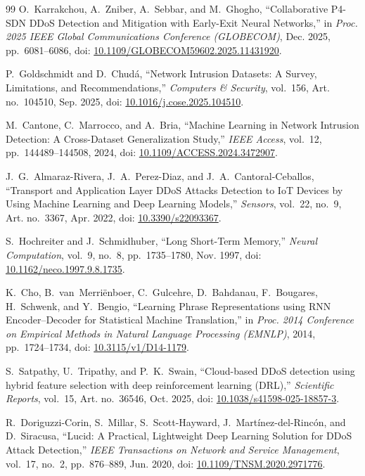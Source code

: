 \documentclass[a4paper,12pt]{article}
\begin{document}
\begin{thebibliography}{99}
O.~Karrakchou, A.~Zniber, A.~Sebbar, and M.~Ghogho, ``Collaborative P4-SDN DDoS Detection and Mitigation with Early-Exit Neural Networks,'' in \textit{Proc. 2025 IEEE Global Communications Conference (GLOBECOM)}, Dec. 2025, pp.~6081--6086, doi: \href{https://doi.org/10.1109/GLOBECOM59602.2025.11431920}{10.1109/GLOBECOM59602.2025.11431920}.

P.~Goldschmidt and D.~Chudá, ``Network Intrusion Datasets: A Survey, Limitations, and Recommendations,'' \textit{Computers \& Security}, vol.~156, Art. no.~104510, Sep. 2025, doi: \href{https://doi.org/10.1016/j.cose.2025.104510}{10.1016/j.cose.2025.104510}.

M.~Cantone, C.~Marrocco, and A.~Bria, ``Machine Learning in Network Intrusion Detection: A Cross-Dataset Generalization Study,'' \textit{IEEE Access}, vol.~12, pp.~144489--144508, 2024, doi: \href{https://doi.org/10.1109/ACCESS.2024.3472907}{10.1109/ACCESS.2024.3472907}.

J.~G.~Almaraz-Rivera, J.~A.~Perez-Diaz, and J.~A.~Cantoral-Ceballos, ``Transport and Application Layer DDoS Attacks Detection to IoT Devices by Using Machine Learning and Deep Learning Models,'' \textit{Sensors}, vol.~22, no.~9, Art. no.~3367, Apr. 2022, doi: \href{https://doi.org/10.3390/s22093367}{10.3390/s22093367}.

S.~Hochreiter and J.~Schmidhuber, ``Long Short-Term Memory,'' \textit{Neural Computation}, vol.~9, no.~8, pp.~1735--1780, Nov. 1997, doi: \href{https://doi.org/10.1162/neco.1997.9.8.1735}{10.1162/neco.1997.9.8.1735}.

K.~Cho, B.~van~Merriënboer, C.~Gulcehre, D.~Bahdanau, F.~Bougares, H.~Schwenk, and Y.~Bengio, ``Learning Phrase Representations using RNN Encoder--Decoder for Statistical Machine Translation,'' in \textit{Proc. 2014 Conference on Empirical Methods in Natural Language Processing (EMNLP)}, 2014, pp.~1724--1734, doi: \href{https://doi.org/10.3115/v1/D14-1179}{10.3115/v1/D14-1179}.

S.~Satpathy, U.~Tripathy, and P.~K.~Swain, ``Cloud-based DDoS detection using hybrid feature selection with deep reinforcement learning (DRL),'' \textit{Scientific Reports}, vol.~15, Art. no.~36546, Oct. 2025, doi: \href{https://doi.org/10.1038/s41598-025-18857-3}{10.1038/s41598-025-18857-3}.

R.~Doriguzzi-Corin, S.~Millar, S.~Scott-Hayward, J.~Martínez-del-Rincón, and D.~Siracusa, ``Lucid: A Practical, Lightweight Deep Learning Solution for DDoS Attack Detection,'' \textit{IEEE Transactions on Network and Service Management}, vol.~17, no.~2, pp.~876--889, Jun. 2020, doi: \href{https://doi.org/10.1109/TNSM.2020.2971776}{10.1109/TNSM.2020.2971776}.


\end{thebibliography}
\end{document}
